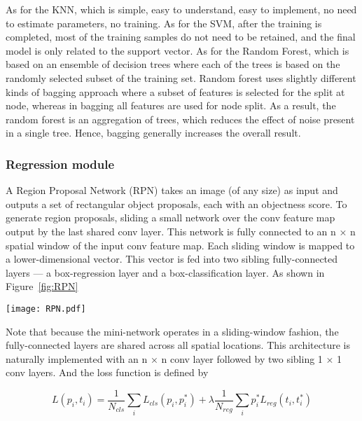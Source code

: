 As for the KNN, which is simple, easy to 
understand, easy to implement, no need 
to estimate parameters, no training. 
As for the SVM,  after the training is 
completed, most of the training samples 
do not need to be retained, and the final 
model is only related to the support vector.
As for the Random Forest, which is based on 
an ensemble of decision trees where each of the 
trees is based on the randomly selected subset of 
the training set. Random forest uses slightly 
different kinds of bagging approach where a 
subset of features is selected for the split
at node, whereas in bagging all features are 
used for node split. As a result, the random 
forest is an aggregation of trees, which reduces 
the effect of noise present in a single tree.
Hence, bagging generally increases the 
overall result.

\subsubsection{Regression module}
\label{sec:MethNetReg}

A Region Proposal Network (RPN) takes an 
image (of any size) as input and outputs a 
set of rectangular object proposals, 
each with an objectness score. To generate 
region proposals, sliding a small network 
over the conv feature map output by the last
shared conv layer. This network is 
fully connected to an n × n spatial window 
of the input conv feature map. Each sliding 
window is mapped to a lower-dimensional vector. 
This vector is fed into two sibling 
fully-connected layers — a box-regression layer 
and a box-classification layer. As shown in
Figure~\ref{fig:RPN}

\begin{figure*}[!ht]
    \centering
    \texttt{[image: RPN.pdf]}
    \caption{The module of the region proposal 
        network.}
    \label{fig:RPN}
\end{figure*} 


Note that because the mini-network operates
in a sliding-window fashion, the 
fully-connected layers are shared across 
all spatial locations. This architecture is 
naturally implemented with an n × n conv layer 
followed by two sibling 1 × 1 conv
layers. And the loss function is defined by

\begin{equation}
    \label{eq:eq_descr_4}
    L({p_i},{t_i})=\frac{1}{N_{cls}}\sum_iL_{cls}(p_i,p_i^*)
     + \lambda\frac{1}{N_{reg}}\sum_ip_i^*L_{reg}(t_i,t_i^*)
\end{equation}

